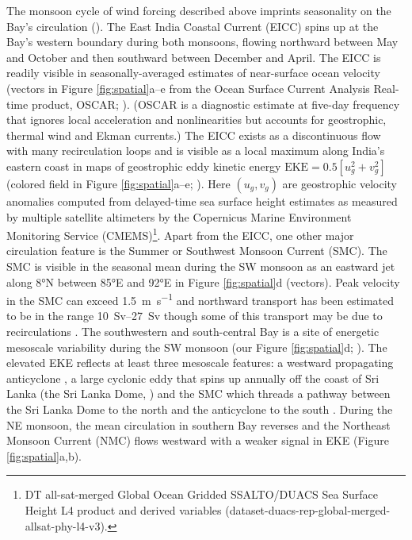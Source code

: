 \documentclass[onecol]{ametsoc}
\begin{document}
The monsoon cycle of wind forcing described above imprints seasonality on the Bay's circulation (\citealp{Schott2002,Shankar2002}).
The East India Coastal Current (EICC) spins up at the Bay's western boundary during both monsoons, flowing northward between May and October and then southward between December and April.
The EICC is readily visible in seasonally-averaged estimates of near-surface ocean velocity (vectors in Figure \ref{fig:spatial}a--e from the Ocean Surface Current Analysis Real-time product, OSCAR; \citealp{Bonjean2002}).
(OSCAR is a diagnostic estimate at five-day frequency that ignores local acceleration and nonlinearities but accounts for geostrophic, thermal wind and Ekman currents.)
The EICC exists as a discontinuous flow with many recirculation loops and is visible as a local maximum along India's eastern coast in maps of geostrophic eddy kinetic energy \(\text{EKE} = 0.5[u_g^2 + v_g^2]\) (colored field in Figure \ref{fig:spatial}a--e; \citealp{Durand2009}).
Here \((u_g, v_g)\) are geostrophic velocity anomalies computed from delayed-time sea surface height estimates as measured by multiple satellite altimeters by the Copernicus Marine Environment Monitoring Service (CMEMS)\footnote{DT all-sat-merged Global Ocean Gridded SSALTO/DUACS Sea Surface Height L4 product and derived variables (dataset-duacs-rep-global-merged-allsat-phy-l4-v3).}. 
Apart from the EICC, one other major circulation feature is the Summer or Southwest Monsoon Current (SMC).
The SMC is visible in the seasonal mean during the SW monsoon as an eastward jet along 8°N between 85°E and 92°E in Figure \ref{fig:spatial}d (vectors).
Peak velocity in the SMC can exceed \SI{1.5}{\meter\per\second} and northward transport has been estimated to be in the range \SIrange{10}{27}{Sv} though some of this transport may be due to recirculations \citep{Wijesekera2016a,Vinayachandran1999,Webber2018}.
The southwestern and south-central Bay is a site of energetic mesoscale variability during the SW monsoon (our Figure \ref{fig:spatial}d; \citealp{Chen2018}).
The elevated EKE reflects at least three mesoscale features: a westward propagating anticyclone \citep{Wijesekera2016a}, a large cyclonic eddy that spins up annually off the coast of Sri Lanka (the Sri Lanka Dome, \citealp{Vinayachandran1998}) and the SMC which threads a pathway between the Sri Lanka Dome to the north and the anticyclone to the south \citep{Vinayachandran1999,Wijesekera2016a}.
During the NE monsoon, the mean circulation in southern Bay reverses and the Northeast Monsoon Current (NMC) flows westward with a weaker signal in EKE (Figure \ref{fig:spatial}a,b).
\end{document}
